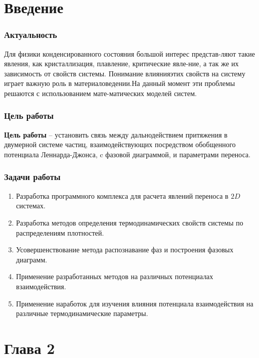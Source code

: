 \documentclass[pdf,hyperref={unicode}]{beamer}
\begin{document}
\section{Введение}

\begin{frame}
	\transdissolve[duration=0.2]
	\frametitle{Актуальность}
	
	Для физики конденсированного состояния большой интерес представ-ляют такие явления, как кристаллизация, плавление, критические явле-ние, а так же их зависимость от свойств системы. Понимание влиянияэтих свойств на систему играет важную роль в материаловедении.На данный момент эти проблемы решаются с использованием мате-матических моделей систем.
	
\end{frame}

\begin{frame}
	\transdissolve[duration=0.2]
	\frametitle{Цель работы}
	
	\textbf{Цель работы} --
установить связь между дальнодействием притяжения в двумерной системе частиц, взаимодействующих посредством обобщенного потенциала Леннарда-Джонса, c фазовой диаграммой, и параметрами переноса.
	
\end{frame}

\begin{frame}
	\transdissolve[duration=0.2]
	\frametitle{Задачи работы}
	
	\begin{enumerate}
\item Разработка программного комплекса для расчета явлений переноса в $2D$ системах.
\item Разработка методов определения термодинамических свойств системы по распределениям плотностей. 
\item Усовершенствование метода распознавание фаз и построения фазовых диаграмм.
\item Применение разработанных методов на различных потенциалах взаимодействия.
\item Применение наработок для изучения влияния потенциала взаимодействия на различные термодинамические параметры.
\end{enumerate}
	
\end{frame}


\section{Глава 2}
\end{document}
